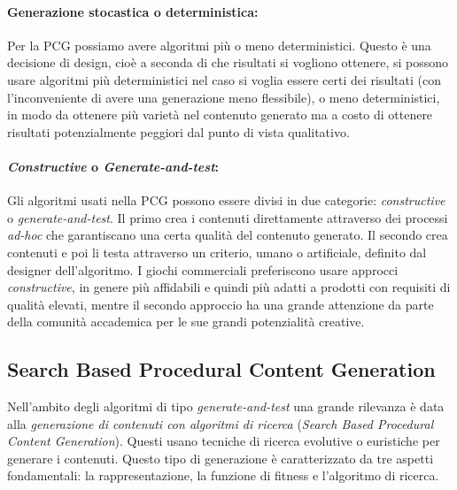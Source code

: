 \documentclass[12pt, italian]{toptesi}
\begin{document}
\paragraph{Generazione stocastica o deterministica:}
Per la PCG possiamo avere algoritmi più o meno deterministici.
Questo è una decisione di design, cioè a seconda di che risultati si vogliono ottenere,
si possono usare algoritmi più deterministici nel caso si voglia essere certi dei risultati (con l'inconveniente
di avere una generazione meno flessibile), o meno deterministici, in modo da ottenere più varietà nel contenuto 
generato ma a costo di ottenere risultati potenzialmente peggiori dal punto di vista qualitativo.

\paragraph{\emph{Constructive} o \emph{Generate-and-test}:}
Gli algoritmi usati nella PCG possono essere divisi in due categorie: \emph{constructive} o \emph{generate-and-test}.
Il primo crea i contenuti direttamente attraverso dei processi \emph{ad-hoc} che garantiscano una certa qualità del contenuto generato.
Il secondo crea contenuti e poi li testa attraverso un criterio, umano o artificiale, definito dal designer dell'algoritmo.
I giochi commerciali preferiscono usare approcci \emph{constructive}, in genere più affidabili e quindi più adatti a prodotti con requisiti di qualità elevati,
mentre il secondo approccio ha una grande attenzione da parte della comunità accademica per le sue grandi potenzialità creative.

\subsection{Search Based Procedural Content Generation}
\label{sec:SBPCG}

Nell'ambito degli algoritmi di tipo \emph{generate-and-test} una grande rilevanza è data alla \emph{generazione di contenuti con algoritmi di ricerca}
(\emph{Search Based Procedural Content Generation}).
Questi usano tecniche di ricerca evolutive o euristiche per generare i contenuti. 
Questo tipo di generazione è caratterizzato da tre aspetti fondamentali: la rappresentazione, la funzione di fitness e l'algoritmo di ricerca.
\end{document}
